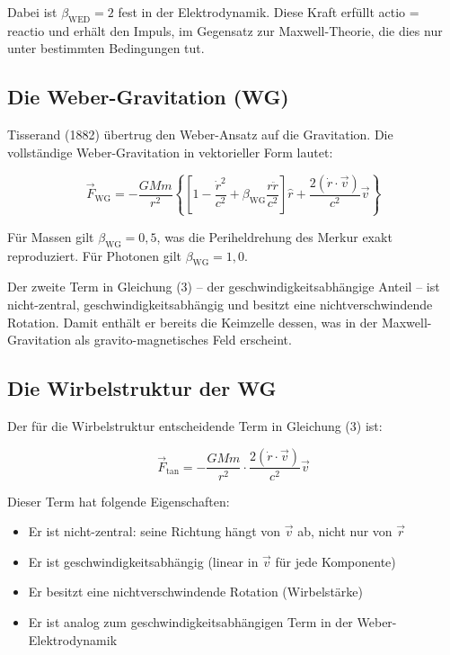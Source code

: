 \documentclass[12pt,a4paper]{article}
\begin{document}
Dabei ist $\beta_{\text{WED}} = 2$ fest in der Elektrodynamik. Diese Kraft erfüllt actio = reactio und erhält den Impuls, im Gegensatz zur Maxwell-Theorie, die dies nur unter bestimmten Bedingungen tut.

\subsection{Die Weber-Gravitation (WG)}

Tisserand (1882) übertrug den Weber-Ansatz auf die Gravitation. Die vollständige Weber-Gravitation in vektorieller Form lautet:

\begin{equation}
\vec{F}_{\text{WG}} = -\frac{GMm}{r^2} \left\{ \left[ 1 - \frac{\dot{r}^2}{c^2} + \beta_{\text{WG}} \frac{r \ddot{r}}{c^2} \right] \hat{r} + \frac{2(\dot{r} \cdot \vec{v})}{c^2} \vec{v} \right\}
\end{equation}

Für Massen gilt $\beta_{\text{WG}} = 0,5$, was die Periheldrehung des Merkur exakt reproduziert. Für Photonen gilt $\beta_{\text{WG}} = 1,0$.

Der zweite Term in Gleichung (3) -- der geschwindigkeitsabhängige Anteil -- ist nicht-zentral, geschwindigkeitsabhängig und besitzt eine nichtverschwindende Rotation. Damit enthält er bereits die Keimzelle dessen, was in der Maxwell-Gravitation als gravito-magnetisches Feld erscheint.

\subsection{Die Wirbelstruktur der WG}

Der für die Wirbelstruktur entscheidende Term in Gleichung (3) ist:

\begin{equation}
\vec{F}_{\text{tan}} = -\frac{GMm}{r^2} \cdot \frac{2(\dot{r} \cdot \vec{v})}{c^2} \vec{v}
\end{equation}

Dieser Term hat folgende Eigenschaften:
\begin{itemize}
\item Er ist nicht-zentral: seine Richtung hängt von $\vec{v}$ ab, nicht nur von $\vec{r}$
\item Er ist geschwindigkeitsabhängig (linear in $\vec{v}$ für jede Komponente)
\item Er besitzt eine nichtverschwindende Rotation (Wirbelstärke)
\item Er ist analog zum geschwindigkeitsabhängigen Term in der Weber-Elektrodynamik
\end{itemize}
\end{document}
